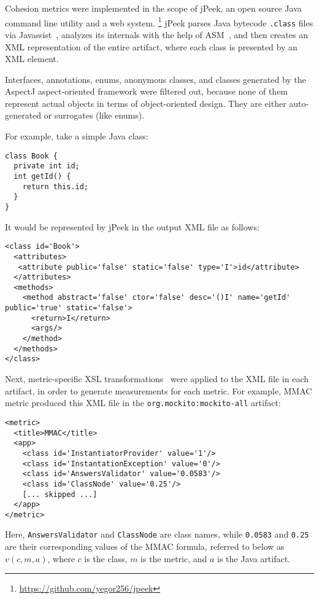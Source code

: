 \documentclass[conference]{IEEEtran}
\newcommand{\code}[1]{\texttt{#1}}
\begin{document}
Cohesion metrics were implemented in the scope of jPeek,
an open source Java command line utility and a web system.%
\footnote{\url{https://github.com/yegor256/jpeek}}
jPeek parses Java bytecode \code{.class} files via Javassist~\cite{chiba98},
analyzes its internals with the help of ASM~\cite{bruneton02},
and then creates an XML representation of the entire artifact,
where each class is presented by an XML element.

Interfaces, annotations, enums, anonymous classes,
and classes generated by the AspectJ aspect-oriented
framework were filtered out, because none of them represent
actual objects in terms of object-oriented design. They are either
auto-generated or surrogates (like enums).

For example, take a simple Java class:

\begin{verbatim}
class Book {
  private int id;
  int getId() {
    return this.id;
  }
}
\end{verbatim}

It would be represented by jPeek in the output XML file as follows:

\begin{verbatim}
<class id='Book'>
  <attributes>
   <attribute public='false' static='false' type='I'>id</attribute>
  </attributes>
  <methods>
    <method abstract='false' ctor='false' desc='()I' name='getId' public='true' static='false'>
      <return>I</return>
      <args/>
    </method>
  </methods>
</class>
\end{verbatim}

Next, metric-specific XSL transformations~\cite{kay00} were applied to the XML file
in each artifact, in order to generate measurements for each metric.
For example, MMAC metric produced this XML file in
the \code{org.mockito:mockito-all} artifact:

\begin{verbatim}
<metric>
  <title>MMAC</title>
  <app>
    <class id='InstantiatorProvider' value='1'/>
    <class id='InstantationException' value='0'/>
    <class id='AnswersValidator' value='0.0583'/>
    <class id='ClassNode' value='0.25'/>
    [... skipped ...]
  </app>
</metric>
\end{verbatim}

Here, \code{AnswersValidator} and \code{ClassNode} are class names,
while \code{0.0583} and \code{0.25} are their corresponding values of
the MMAC formula, referred to below as $v(c,m,a)$, where
$c$ is the class, $m$ is the metric, and $a$ is the Java artifact.
\end{document}

